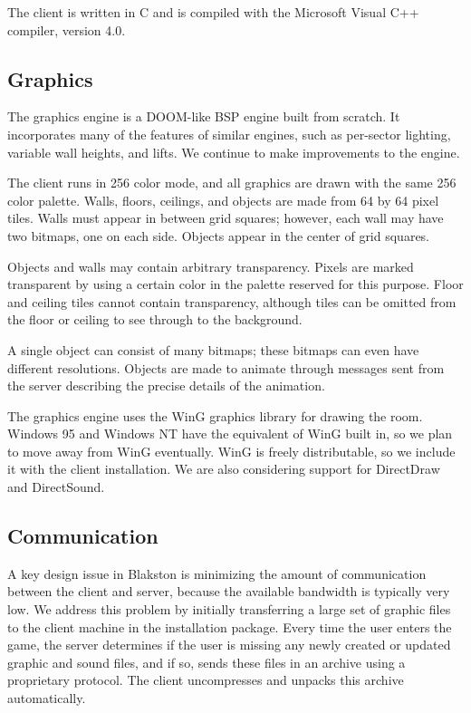 \documentclass[12pt]{article}
\begin{document}
The client is written in C and is compiled with the Microsoft Visual
C++ compiler, version 4.0.

\subsection{Graphics}

The graphics engine is a DOOM-like BSP engine built from scratch.  It
incorporates many of the features of similar engines, such as
per-sector lighting, variable wall heights, and lifts.  We continue to
make improvements to the engine.

The client runs in 256 color mode, and all graphics are drawn with the
same 256 color palette.  Walls, floors, ceilings, and objects are made
from 64 by 64 pixel tiles.  Walls must appear in between grid squares;
however, each wall may have two bitmaps, one on each side.  Objects
appear in the center of grid squares.

Objects and walls may contain arbitrary transparency.  Pixels are
marked transparent by using a certain color in the palette reserved
for this purpose.  Floor and ceiling tiles cannot contain
transparency, although tiles can be omitted from the floor or ceiling
to see through to the background.

A single object can consist of many bitmaps; these bitmaps can even
have different resolutions.  Objects are made to animate through
messages sent from the server describing the precise details of the
animation.

The graphics engine uses the WinG graphics library for drawing the
room.  Windows 95 and Windows NT have the equivalent of WinG built in,
so we plan to move away from WinG eventually.  WinG is freely
distributable, so we include it with the client installation.  We are
also considering support for DirectDraw and DirectSound.

\subsection{Communication}

A key design issue in Blakston is minimizing the amount of
communication between the client and server, because the available
bandwidth is typically very low.  We address this problem by initially
transferring a large set of graphic files to the client machine in the
installation package.  Every time the user enters the game, the server
determines if the user is missing any newly created or updated graphic
and sound files, and if so, sends these files in an archive using a
proprietary protocol.  The client uncompresses and unpacks this
archive automatically.
\end{document}
